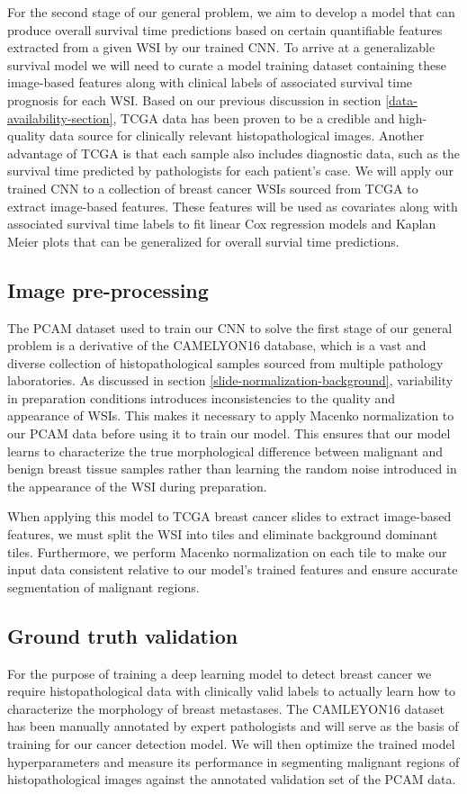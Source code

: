 \documentclass{l4proj}
\begin{document}
For the second stage of our general problem, we aim to develop a model that can produce overall survival time predictions based on certain quantifiable features extracted from a given WSI by our trained CNN. To arrive at a generalizable survival model we will need to curate a model training dataset containing these image-based features along with clinical labels of associated survival time prognosis for each WSI. Based on our previous discussion in section \ref{data-availability-section}, TCGA data has been proven to be a credible and high-quality data source for clinically relevant histopathological images. Another advantage of TCGA is that each sample also includes diagnostic data, such as the survival time predicted by pathologists for each patient's case. We will apply our trained CNN to a collection of breast cancer WSIs sourced from TCGA to extract image-based features. These features will be used as covariates along with associated survival time  labels to fit linear Cox regression models and Kaplan Meier plots that can be generalized for overall survial time predictions.

\subsection{Image pre-processing}
The PCAM dataset used to train our CNN to solve the first stage of our general problem is a derivative of the CAMELYON16 database, which is a vast and diverse collection of histopathological samples sourced from multiple pathology laboratories. As discussed in section \ref{slide-normalization-background}, variability in preparation conditions introduces inconsistencies to the quality and appearance of WSIs. This makes it necessary to apply Macenko normalization to our PCAM data before using it to train our model. This ensures that our model learns to characterize the true morphological difference between malignant and benign breast tissue samples rather than learning the random noise introduced in the appearance of the WSI during preparation.

When applying this model to TCGA breast cancer slides to extract image-based features, we must split the WSI into tiles and eliminate background dominant tiles. Furthermore, we perform Macenko normalization on each tile to make our input data  consistent relative to our model's trained features and ensure accurate segmentation of malignant regions. 

\subsection{Ground truth validation}
For the purpose of training a deep learning model to detect breast cancer we require histopathological data with clinically valid labels to actually learn how to characterize the morphology of breast metastases. The CAMLEYON16 dataset has been manually annotated by expert pathologists and will serve as the basis of training for our cancer detection model. We will then optimize the trained model hyperparameters and measure its performance in segmenting malignant regions of histopathological images against the annotated validation set of the PCAM data. 
\end{document}

